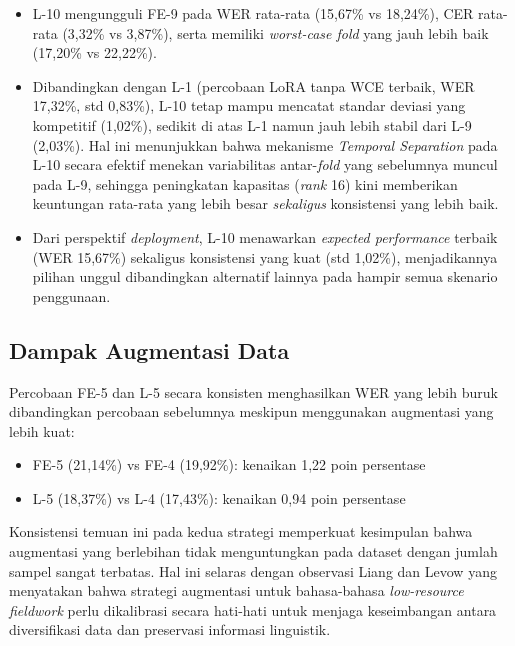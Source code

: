 \begin{itemize}
    \item L-10 mengungguli FE-9 pada WER rata-rata (15,67\% vs 18,24\%), CER rata-rata (3,32\% vs 3,87\%), serta memiliki \textit{worst-case fold} yang jauh lebih baik (17,20\% vs 22,22\%).

    \item Dibandingkan dengan L-1 (percobaan LoRA tanpa WCE terbaik, WER 17,32\%, std 0,83\%), L-10 tetap mampu mencatat standar deviasi yang kompetitif (1,02\%), sedikit di atas L-1 namun jauh lebih stabil dari L-9 (2,03\%). Hal ini menunjukkan bahwa mekanisme \textit{Temporal Separation} pada L-10 secara efektif menekan variabilitas antar-\textit{fold} yang sebelumnya muncul pada L-9, sehingga peningkatan kapasitas (\textit{rank} 16) kini memberikan keuntungan rata-rata yang lebih besar \textit{sekaligus} konsistensi yang lebih baik.

    \item Dari perspektif \textit{deployment}, L-10 menawarkan \textit{expected performance} terbaik (WER 15,67\%) sekaligus konsistensi yang kuat (std 1,02\%), menjadikannya pilihan unggul dibandingkan alternatif lainnya pada hampir semua skenario penggunaan.
\end{itemize}

\subsection{Dampak Augmentasi Data}

Percobaan FE-5 dan L-5 secara konsisten menghasilkan WER yang lebih buruk dibandingkan percobaan sebelumnya meskipun menggunakan augmentasi yang lebih kuat:

\begin{itemize}
    \item FE-5 (21,14\%) vs FE-4 (19,92\%): kenaikan 1,22 poin persentase
    \item L-5 (18,37\%) vs L-4 (17,43\%): kenaikan 0,94 poin persentase
\end{itemize}

Konsistensi temuan ini pada kedua strategi memperkuat kesimpulan bahwa augmentasi yang berlebihan tidak menguntungkan pada dataset dengan jumlah sampel sangat terbatas. Hal ini selaras dengan observasi Liang dan Levow \cite{liang2025fieldmatters} yang menyatakan bahwa strategi augmentasi untuk bahasa-bahasa \textit{low-resource fieldwork} perlu dikalibrasi secara hati-hati untuk menjaga keseimbangan antara diversifikasi data dan preservasi informasi linguistik.

